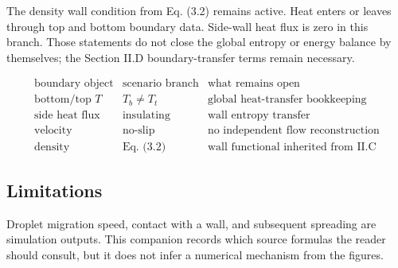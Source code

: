 The density wall condition from Eq. (3.2) remains active.  Heat enters or leaves
through top and bottom boundary data.  Side-wall heat flux is zero in this
branch.  Those statements do not close the global entropy or energy balance by
themselves; the Section II.D boundary-transfer terms remain necessary.

\[
\begin{array}{c|c|c}
\text{boundary object} & \text{scenario branch} & \text{what remains open} \\
\hline
\text{bottom/top }T & T_b\ne T_t & \text{global heat-transfer bookkeeping} \\
\text{side heat flux} & \text{insulating} & \text{wall entropy transfer} \\
\text{velocity} & \text{no-slip} & \text{no independent flow reconstruction} \\
\text{density} & \text{Eq. (3.2)} & \text{wall functional inherited from II.C}
\end{array}
\]

\subsection*{Limitations}

Droplet migration speed, contact with a wall, and subsequent spreading are
simulation outputs.  This companion records which source formulas the reader
should consult, but it does not infer a numerical mechanism from the figures.
